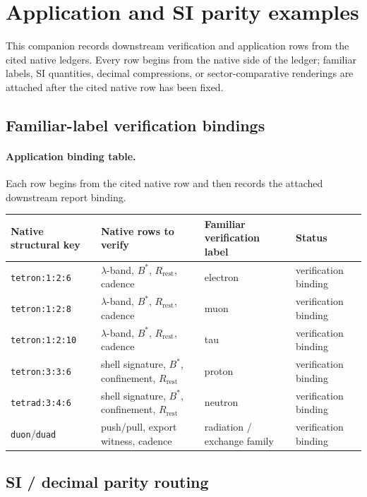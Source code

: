 \section{Application and SI parity examples}\label{app:application-si}

This companion records downstream verification and application rows from the cited native ledgers. Every row begins from the native side of the ledger; familiar labels, SI quantities, decimal compressions, or sector-comparative renderings are attached after the cited native row has been fixed.

\subsection{Familiar-label verification bindings}\label{app:familiar-bindings}
\paragraph{Application binding table.} Each row begins from the cited native row and then records the attached downstream report binding.

\begin{center}
\begin{tabularx}{\linewidth}{@{}lXXl@{}}
\toprule
Native structural key & Native rows to verify & Familiar verification label & Status \\
\midrule
\texttt{tetron:1:2:6} & $\lambda$-band, $B^*$, $R_{\mathrm{rest}}$, cadence & electron & verification binding \\
\texttt{tetron:1:2:8} & $\lambda$-band, $B^*$, $R_{\mathrm{rest}}$, cadence & muon & verification binding \\
\texttt{tetron:1:2:10} & $\lambda$-band, $B^*$, $R_{\mathrm{rest}}$, cadence & tau & verification binding \\
\texttt{tetron:3:3:6} & shell signature, $B^*$, confinement, $R_{\mathrm{rest}}$ & proton & verification binding \\
\texttt{tetrad:3:4:6} & shell signature, $B^*$, confinement, $R_{\mathrm{rest}}$ & neutron & verification binding \\
\texttt{duon}/\texttt{duad} & push/pull, export witness, cadence & radiation / exchange family & verification binding \\
\bottomrule
\end{tabularx}
\end{center}

\subsection{SI / decimal parity routing}\label{app:si-routing}
